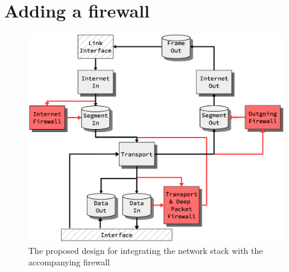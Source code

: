 \section{Adding a firewall}
\begin{figure}
\centering
\includegraphics[scale=0.50]{future_work/firewall_integration_design.eps}
\caption{The proposed design for integrating the network stack with the
accompanying firewall}
\label{fig:firewall_integration_design}
\end{figure}


